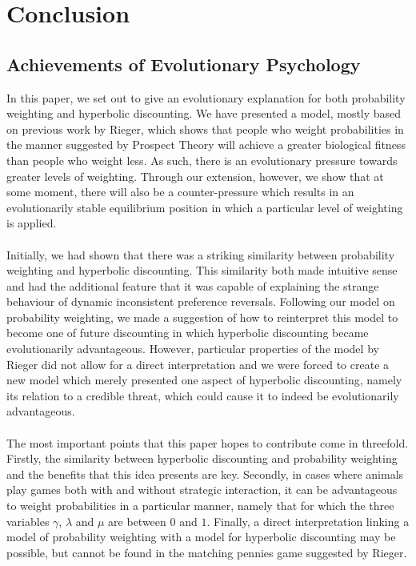 \documentclass[a4paper,10pt]{article}
\numberwithin{equation}{section}
\begin{document}
\section{Conclusion}
\label{sec:Conclusion}
\subsection{Achievements of Evolutionary Psychology}
\label{sec:Achievements of Evolutionary Psychology}

In this paper, we set out to give an evolutionary explanation for both probability weighting and hyperbolic discounting. We have presented a model, mostly based on previous work by Rieger, which shows that people who weight probabilities in the manner suggested by Prospect Theory will achieve a greater biological fitness than people who weight less. As such, there is an evolutionary pressure towards greater levels of weighting. Through our extension, however, we show that at some moment, there will also be a counter-pressure which results in an evolutionarily stable equilibrium position in which a particular level of weighting is applied.\\
\\
Initially, we had shown that there was a striking similarity between probability weighting and hyperbolic discounting. This similarity both made intuitive sense and had the additional feature that it was capable of explaining the strange behaviour of dynamic inconsistent preference reversals. Following our model on probability weighting, we made a suggestion of how to reinterpret this model to become one of future discounting in which hyperbolic discounting became evolutionarily advantageous. However, particular properties of the model by Rieger did not allow for a direct interpretation and we were forced to create a new model which merely presented one aspect of hyperbolic discounting, namely its relation to a credible threat, which could cause it to indeed be evolutionarily advantageous.\\
\\
The most important points that this paper hopes to contribute come in threefold. Firstly, the similarity between hyperbolic discounting and probability weighting and the benefits that this idea presents are key. Secondly, in cases where animals play games both with and without strategic interaction, it can be advantageous to weight probabilities in a particular manner, namely that for which the three variables $\gamma$, $\lambda$ and $\mu$ are between $0$ and $1$. Finally, a direct interpretation linking a model of probability weighting with a model for hyperbolic discounting may be possible, but cannot be found in the matching pennies game suggested by Rieger.\\
\end{document}
